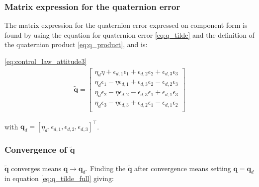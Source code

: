 \subsubsection*{ Matrix expression for the quaternion error}

The matrix expression for the quaternion error expressed on component form is found by using the equation for quaternion error  \eqref{eq:q_tilde} and the definition of the quaternion product \eqref{eq:q_product}, and is:


\eqref{eq:control_law_attitude3}
\begin{equation}
    \begin{aligned}
    \tilde{\boldsymbol{q}}
    =
    \begin{bmatrix}
    \eta_d \eta + \epsilon_{d,1} \epsilon_1 + \epsilon_{d,2} \epsilon_2 + \epsilon_{d,3} \epsilon_3 \\
    \eta_d \epsilon_1 - \eta \epsilon_{d,1} + \epsilon_{d,3} \epsilon_{2} - \epsilon_{d,2} \epsilon_{3} \\
    \eta_d \epsilon_2 - \eta \epsilon_{d,2} - \epsilon_{d,3} \epsilon_{1} + \epsilon_{d,1} \epsilon_{3} \\
    \eta_d \epsilon_3 - \eta \epsilon_{d,3} + \epsilon_{d,2} \epsilon_{1} - \epsilon_{d,1} \epsilon_{2} \\
    \end{bmatrix}
    \label{eq:q_tilde_full}
    \end{aligned}
\end{equation}

with $\mathbf{q}_d = [\eta_d, \epsilon_{d,1}, \epsilon_{d,2}, \epsilon_{d,3}]^\top$.

\subsubsection*{ Convergence of $\tilde{\mathbf{q}}$}

$\tilde{\mathbf{q}}$ converges means $\mathbf{q} \rightarrow \mathbf{q}_d$. Finding the $\tilde{\mathbf{q}}$ after convergence means setting $\mathbf{q} = \mathbf{q}_d$  in equation \eqref{eq:q_tilde_full} giving:

